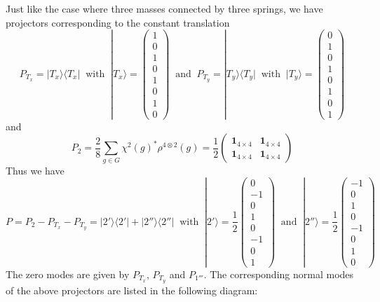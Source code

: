 \documentclass[]{ctexart}
\begin{document}
Just like the case where three masses connected by three springs, we have projectors corresponding to the constant translation
\begin{equation*}
P_{T_x}=|T_x\rangle\langle T_x|\;\;\text{with}\;\;|T_x\rangle=\begin{pmatrix}
1\\0\\1\\0\\1\\0\\1\\0
\end{pmatrix}\;\;\text{and}\;\;P_{T_y}=|T_y\rangle\langle T_y|\;\;\text{with}\;\;|T_y\rangle=\begin{pmatrix}
0\\1\\0\\1\\0\\1\\0\\1
\end{pmatrix}
\end{equation*} 
and 
\begin{equation*}
P_2=\frac{2}{8}\sum_{g\in G}\chi^2(g)^*\rho^{4\otimes 2}(g)=\frac{1}{2}\begin{pmatrix}
\mathbf 1_{4\times 4} &  \mathbf 1_{4\times 4}\\
\mathbf 1_{4\times 4} & \mathbf 1_{4\times 4}
\end{pmatrix}
\end{equation*}
Thus we have 
\begin{equation*}
P=P_2-P_{T_x}-P_{T_y}=|2'\rangle\langle 2'|+|2''\rangle\langle 2''|\;\;\text{with}\;\;|2'\rangle=\frac{1}{2}\begin{pmatrix}
0\\-1\\0\\1\\0\\-1\\0\\1
\end{pmatrix}\;\;\text{and}\;\;|2''\rangle=\frac{1}{2}\begin{pmatrix}
-1\\0\\1\\0\\-1\\0\\1\\0
\end{pmatrix}
\end{equation*}
The zero modes are given by $P_{T_x}$, $P_{T_y}$ and $P_{1'''}$. The corresponding normal modes of the above projectors are listed in the following 
diagram: 
\end{document}
